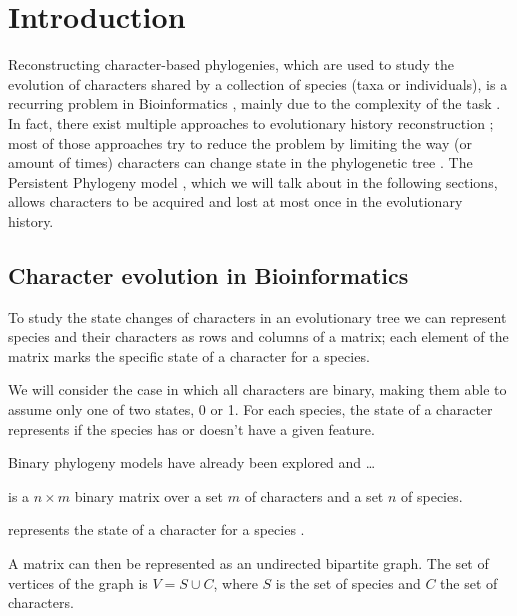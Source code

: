 
\section{Introduction}\label{sec:introduction}


Reconstructing character-based phylogenies, which are used to study the evolution of characters shared by a collection of species (taxa or individuals), is a recurring problem in Bioinformatics , mainly due to the complexity of the task . In fact, there exist multiple approaches to evolutionary history reconstruction ; most of those approaches try to reduce the problem by limiting the way (or amount of times) characters can change state in the phylogenetic tree \cite{PPptime1994} . The Persistent Phylogeny model , which we will talk about in the following sections, allows characters to be acquired and lost at most once in the evolutionary history.

\subsection{Character evolution in Bioinformatics}\label{ssec:charevo}


To study the state changes of characters in an evolutionary tree we can represent species and their characters as rows and columns of a matrix; each element of the matrix marks the specific state of a character for a species.

We will consider the case in which all characters are binary, making them able to assume only one of two states, 0 or 1. For each species, the state of a character represents if the species has or doesn't have a given feature.

Binary phylogeny models have already been explored  and \dots

\begin{definition}\label{def:m}
  \m{} is a $n \times m$ binary matrix over a set $m$ of characters and a set $n$ of species.

  \m[i][j] represents the state of a character \character[j] for a species \species[i].
\end{definition}

A matrix \m{} can then be represented as an undirected bipartite graph. The set of vertices of the graph is $V = S \cup C$, where $S$ is the set of species and $C$ the set of characters.


